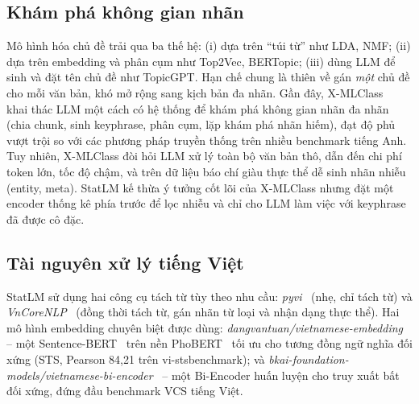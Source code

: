 \subsection{Khám phá không gian nhãn}
Mô hình hóa chủ đề trải qua ba thế hệ: (i) dựa trên ``túi từ'' như LDA, NMF;
(ii) dựa trên embedding và phân cụm như Top2Vec, BERTopic; (iii) dùng LLM để
sinh và đặt tên chủ đề như TopicGPT. Hạn chế chung là thiên về gán
\emph{một} chủ đề cho mỗi văn bản, khó mở rộng sang kịch bản đa nhãn. Gần đây,
X-MLClass~\cite{li2024open} khai thác LLM một cách có hệ thống để khám phá không
gian nhãn đa nhãn (chia chunk, sinh keyphrase, phân cụm, lặp khám phá nhãn hiếm),
đạt độ phủ vượt trội so với các phương pháp truyền thống trên nhiều benchmark
tiếng Anh. Tuy nhiên, X-MLClass đòi hỏi LLM xử lý toàn bộ văn bản thô, dẫn đến
chi phí token lớn, tốc độ chậm, và trên dữ liệu báo chí giàu thực thể dễ sinh
nhãn nhiễu (entity, meta). StatLM kế thừa ý tưởng cốt lõi của X-MLClass nhưng đặt
một encoder thống kê phía trước để lọc nhiễu và chỉ cho LLM làm việc với keyphrase
đã được cô đặc.

\subsection{Tài nguyên xử lý tiếng Việt}
StatLM sử dụng hai công cụ tách từ tùy theo nhu cầu: \emph{pyvi}~\cite{pyvi} (nhẹ,
chỉ tách từ) và \emph{VnCoreNLP}~\cite{vu2018vncorenlp} (đồng thời tách từ, gán
nhãn từ loại và nhận dạng thực thể). Hai mô hình embedding chuyên biệt được dùng:
\emph{dangvantuan/vietnamese-embedding}~\cite{dangvantuan2021vietnamese} -- một
Sentence-BERT~\cite{reimers2019sentence} trên nền PhoBERT~\cite{nguyen2020phobert}
tối ưu cho tương đồng ngữ nghĩa đối xứng (STS, Pearson 84,21 trên
vi-stsbenchmark); và
\emph{bkai-foundation-models/vietnamese-bi-encoder}~\cite{nguyen2025improving} --
một Bi-Encoder huấn luyện cho truy xuất bất đối
xứng, đứng đầu benchmark VCS tiếng Việt.


